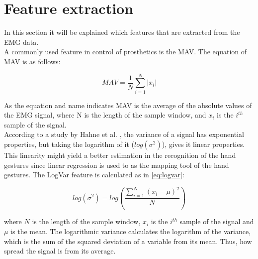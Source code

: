 \section{Feature extraction}
In this section it will be explained which features that are extracted from the EMG data.\\
A commonly used feature in control of prosthetics is the MAV. The equation of MAV is as follows:

\begin{equation}
MAV = \frac{1}{N}\sum\limits_{i=1}^N|x_i|
\end{equation}

As the equation and name indicates MAV is the average of the absolute values of the EMG signal, where N is the length of the sample window, and $x_i$ is the $i^{th}$ sample of the signal. \\
According to a study by Hahne et al. \cite{hahne2014}, the variance of a signal has exponential properties, but taking the logarithm of it ($log(\sigma^2)$), gives it linear properties. This linearity might yield a better estimation in the recognition of the hand gestures since linear regression is used to as the mapping tool of the hand gestures. The LogVar feature is calculated as in \eqref{eq:logvar}:

\begin{equation} \label{eq:logvar}
log(\sigma^2) = log(\frac{\sum\limits_{i=1}^N(x_i - \mu)^2}{N})
\end{equation}

where $N$ is the length of the sample window, $x_i$ is the $i^{th}$ sample of the signal and $\mu$ is the mean. The logarithmic variance calculates the logarithm of the variance, which is the sum of the squared deviation of a variable from its mean. Thus, how spread the signal is from its average.


